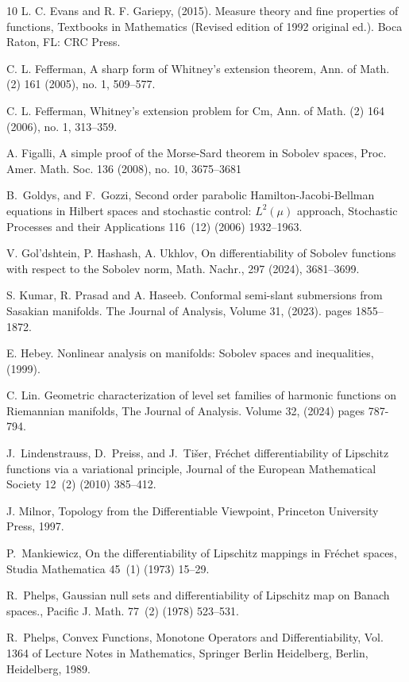 \documentclass[a4paper,12pt,reqno]{amsart}%
\theoremstyle{definition}
\numberwithin{equation}{section}
\numberwithin{theorem}{section}
\begin{document}
\begin{thebibliography}{10}
 L. C. Evans and R. F. Gariepy,  (2015). {Measure theory and fine pro\-per\-ties of functions}, Textbooks in Mathematics (Revised edition of 1992 ori\-gi\-nal ed.). Boca Raton, FL: CRC Press.

 C. L. Fefferman, A sharp form of Whitney's extension theorem, Ann. of Math. (2) 161 (2005), no. 1, 509–577.

 C. L. Fefferman,  Whitney's extension problem for Cm, Ann. of Math. (2) 164 (2006), no. 1, 313–359. 

 A. Figalli, A simple proof of the Morse-Sard theorem in Sobolev spaces, Proc. Amer. Math. Soc. 136 (2008), no. 10, 3675–3681

B.~Goldys, and F.~Gozzi, {Second order parabolic Hamilton-Jacobi-Bellman
  equations in Hilbert spaces and stochastic control: $L^2(\mu)$ approach},
  Stochastic Processes and their Applications 116~(12) (2006) 1932--1963.

 V. Gol’dshtein, P. Hashash, A. Ukhlov, On differentiability of Sobolev functions with respect to the Sobolev norm, Math. Nachr., 297 (2024), 3681–3699.


 S. Kumar, R. Prasad and A. Haseeb. Conformal semi-slant submersions from Sasakian manifolds. The Journal of Analysis, Volume 31, (2023). pages 1855–1872.


 E. Hebey.  Nonlinear analysis on manifolds: Sobolev spaces and inequalities, (1999).

  C. Lin. Geometric characterization of level set families of harmonic functions on Riemannian manifolds, The Journal of Analysis. Volume 32, (2024) pages 787-794.

J.~Lindenstrauss, D.~Preiss, and J.~Ti{\v{s}}er, {Fr{\'{e}}chet
  differentiability of Lipschitz functions via a variational principle},
  Journal of the European Mathematical Society 12~(2) (2010) 385--412.

 J. Milnor, Topology from the Differentiable Viewpoint, Princeton University Press, 1997.

P.~Mankiewicz, On the differentiability of {L}ipschitz mappings in {F}réchet
  spaces, Studia Mathematica 45~(1) (1973) 15--29.

R.~Phelps, Gaussian null sets and differentiability of {L}ipschitz map on
  {B}anach spaces., Pacific J. Math. 77~(2) (1978) 523--531.

R.~Phelps, {Convex Functions, Monotone Operators and Differentiability}, Vol.
  1364 of Lecture Notes in Mathematics, Springer Berlin Heidelberg, Berlin,
  Heidelberg, 1989.



\end{thebibliography}
\end{document}
